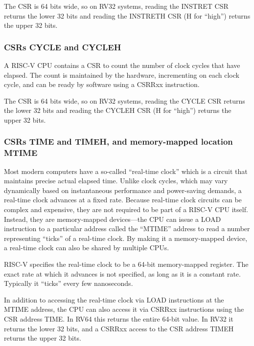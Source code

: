 The CSR is 64 bits wide, so on RV32 systems, reading the INSTRET CSR
returns the lower 32 bits and reading the INSTRETH CSR (H for
``high'') returns the upper 32 bits.


\subsubsection{CSRs CYCLE and CYCLEH}

\label{Sec_CSRs_CYCLE}

A RISC-V CPU contains a CSR to count the number of clock cycles that
have elapsed.  The count is maintained by the hardware, incrementing
on each clock cycle, and can be ready by software using a CSRRxx
instruction.

The CSR is 64 bits wide, so on RV32 systems, reading the CYCLE CSR
returns the lower 32 bits and reading the CYCLEH CSR (H for ``high'')
returns the upper 32 bits.


\subsubsection{CSRs TIME and TIMEH, and memory-mapped location MTIME}

\label{Sec_CSRs_TIME}

Most modern computers have a so-called ``real-time clock'' which is a
circuit that maintains precise actual elapsed time.  Unlike clock
cycles, which may vary dynamically based on instantaneous performance
and power-saving demands, a real-time clock advances at a fixed rate.
Because real-time clock circuits can be complex and expensive, they
are not required to be part of a RISC-V CPU itself.  Instead, they are
memory-mapped devices---the CPU can issue a LOAD instruction to a
particular address called the ``MTIME'' address to read a number
representing ``ticks'' of a real-time clock.  By making it a
memory-mapped device, a real-time clock can also be shared by multiple
CPUs.

RISC-V specifies the real-time clock to be a 64-bit memory-mapped
register.  The exact rate at which it advances is not specified, as
long as it is a constant rate.  Typically it ``ticks'' every few
nanoseconds.

In addition to accessing the real-time clock via LOAD instructions at
the MTIME address, the CPU can also access it via CSRRxx instructions
using the CSR address TIME.  In RV64 this returns the entire 64-bit
value.  In RV32 it returns the lower 32 bits, and a CSRRxx access to
the CSR address TIMEH returns the upper 32 bits.

